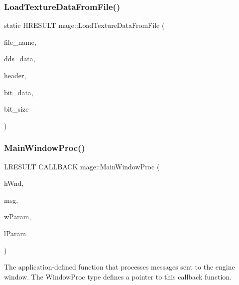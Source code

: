 \subsubsection{\texorpdfstring{Load\+Texture\+Data\+From\+File()}{LoadTextureDataFromFile()}}
{\footnotesize\ttfamily static H\+R\+E\+S\+U\+LT mage\+::\+Load\+Texture\+Data\+From\+File (\begin{DoxyParamCaption}\item[{\+\_\+\+In\+\_\+z\+\_\+ const wchar\+\_\+t $\ast$}]{file\+\_\+name,  }\item[{std\+::unique\+\_\+ptr$<$ uint8\+\_\+t\mbox{[}$\,$\mbox{]}$>$ \&}]{dds\+\_\+data,  }\item[{\hyperlink{structmage_1_1_d_d_s___h_e_a_d_e_r}{D\+D\+S\+\_\+\+H\+E\+A\+D\+ER} $\ast$$\ast$}]{header,  }\item[{uint8\+\_\+t $\ast$$\ast$}]{bit\+\_\+data,  }\item[{size\+\_\+t $\ast$}]{bit\+\_\+size }\end{DoxyParamCaption})\hspace{0.3cm}{\ttfamily [static]}}

\hypertarget{namespacemage_ae25d5711b64302f181eaa4e7b84b90f1}{}\label{namespacemage_ae25d5711b64302f181eaa4e7b84b90f1} 
\subsubsection{\texorpdfstring{Main\+Window\+Proc()}{MainWindowProc()}}
{\footnotesize\ttfamily L\+R\+E\+S\+U\+LT C\+A\+L\+L\+B\+A\+CK mage\+::\+Main\+Window\+Proc (\begin{DoxyParamCaption}\item[{H\+W\+ND}]{h\+Wnd,  }\item[{U\+I\+NT}]{msg,  }\item[{W\+P\+A\+R\+AM}]{w\+Param,  }\item[{L\+P\+A\+R\+AM}]{l\+Param }\end{DoxyParamCaption})\hspace{0.3cm}{\ttfamily [noexcept]}}

The application-\/defined function that processes messages sent to the engine window. The Window\+Proc type defines a pointer to this callback function.



